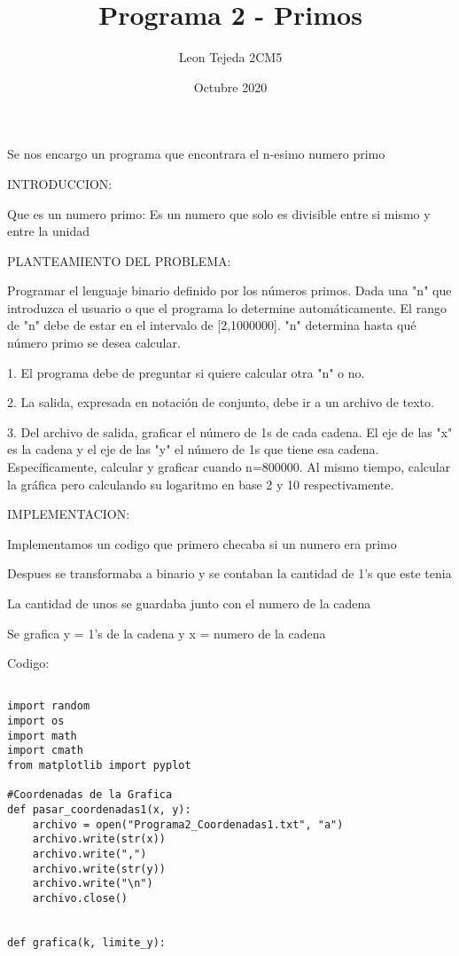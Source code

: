 \documentclass{article}
\title{Programa 2 - Primos}
\author{Leon Tejeda 2CM5}
\date{Octubre 2020}
\begin{document}
\maketitle
\begin{flushleft}
Se nos encargo un programa que encontrara el n-esimo numero primo

INTRODUCCION:

Que es un numero primo:		Es un numero que solo es divisible entre  si mismo y entre la unidad

PLANTEAMIENTO DEL PROBLEMA:

Programar el lenguaje binario definido por los números primos. Dada una "n" que introduzca el usuario o que el programa lo determine automáticamente. El rango de "n" debe de estar en el intervalo de [2,1000000]. "n" determina hasta qué número primo se desea calcular.

1. El programa debe de preguntar si quiere calcular otra "n" o no.

2. La salida, expresada en notación de conjunto, debe ir a un archivo de texto.

3. Del archivo de salida, graficar el número de 1s de cada cadena. El eje de las "x" es la cadena y el eje de las "y" el número de 1s que tiene esa cadena. Específicamente, calcular y graficar cuando n=800000. Al mismo tiempo, calcular la gráfica pero calculando su logaritmo en 
base 2 y 10 respectivamente.

IMPLEMENTACION:

Implementamos un codigo que primero checaba si un numero era primo

Despues se transformaba a  binario y se contaban la cantidad de 1's que este tenia

La cantidad de unos se guardaba junto con el numero de la cadena

Se grafica y = 1's de la cadena  y x = numero de la cadena



Codigo:

\begin{lstlisting}

import random
import os
import math
import cmath
from matplotlib import pyplot

#Coordenadas de la Grafica
def pasar_coordenadas1(x, y):
    archivo = open("Programa2_Coordenadas1.txt", "a")
    archivo.write(str(x))
    archivo.write(",")
    archivo.write(str(y))
    archivo.write("\n")
    archivo.close()
    
    
def grafica(k, limite_y):
     

\end{lstlisting}
\end{flushleft}
\end{document}
